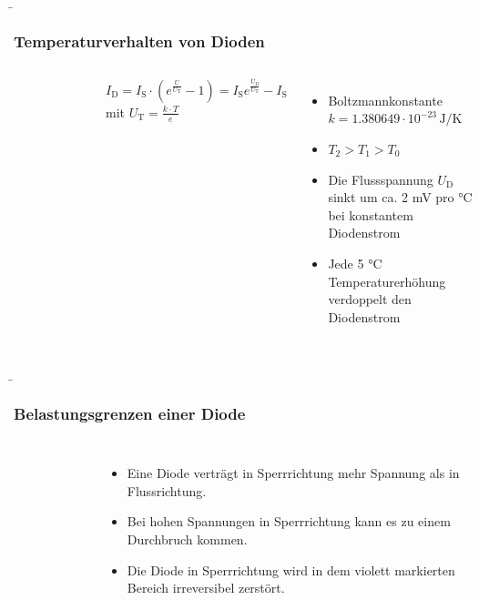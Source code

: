 \begin{frame}
    \b{
        \frametitle{Temperaturverhalten von Dioden}
        \begin{columns}
            \begin{figure}[H]
                \centering
                
            \end{figure}

            $I_\mathrm{D} = I_\mathrm{S} \cdot (e^{\frac{U}{U_\mathrm{T}}} - 1) = I_\mathrm{S}  e^{\frac{U_\mathrm{D}}{U_\mathrm{T}}} - I_\mathrm{S}$ mit $U_\mathrm{T} = \frac{k \cdot T}{e}$
            \begin{itemize}
                \item Boltzmannkonstante $k = 1.380649 \cdot 10^{-23}\,\mathrm{J/K}$
                \item $T_2 > T_1 > T_0 $
                \item Die Flussspannung $U_\mathrm{D}$ sinkt um ca. 2 mV pro °C bei konstantem Diodenstrom
                \item Jede 5 °C Temperaturerhöhung verdoppelt den Diodenstrom
            \end{itemize}
        \end{columns}}
\end{frame}


\begin{frame}
    \b{
        \frametitle{Belastungsgrenzen einer Diode}
        \begin{columns}
            \begin{figure}[H]
                \centering
                
            \end{figure}

            \begin{itemize}
                \item Eine Diode verträgt in Sperrrichtung mehr Spannung als in Flussrichtung.
                \item Bei hohen Spannungen in Sperrrichtung kann es zu einem Durchbruch kommen.
                \item Die Diode in Sperrrichtung wird in dem violett markierten Bereich irreversibel zerstört.
            \end{itemize}
        \end{columns}
        }
\end{frame}


